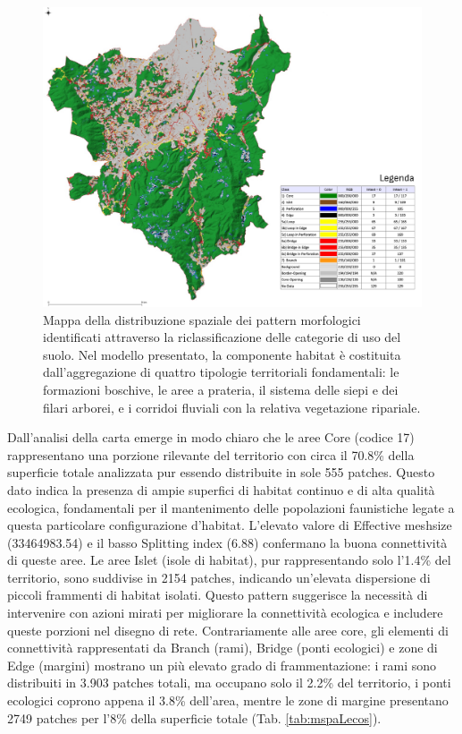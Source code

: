 \documentclass[
]{book}
\begin{document}
\begin{figure}

{\centering \includegraphics[width=\linewidth]{./figs/mspa8211_relazione} 

}

\caption{Mappa della distribuzione spaziale dei pattern morfologici identificati attraverso la riclassificazione delle categorie di uso del suolo. Nel modello presentato, la componente habitat è  costituita dall'aggregazione di quattro tipologie territoriali fondamentali: le formazioni boschive, le aree a prateria, il sistema delle siepi e dei filari arborei, e i corridoi fluviali con la relativa vegetazione ripariale.}\label{fig:mspaAll}
\end{figure}

Dall'analisi della carta emerge in modo chiaro che le aree Core (codice 17) rappresentano una porzione rilevante del territorio con circa il 70.8\% della superficie totale analizzata pur essendo distribuite in sole 555 patches.
Questo dato indica la presenza di ampie superfici di habitat continuo e di alta qualità ecologica, fondamentali per il mantenimento delle popolazioni faunistiche legate a questa particolare configurazione d'habitat.
L'elevato valore di Effective meshsize (33464983.54) e il basso Splitting index (6.88) confermano la buona connettività di queste aree.
Le aree Islet (isole di habitat), pur rappresentando solo l'1.4\% del territorio, sono suddivise in 2154 patches, indicando un'elevata dispersione di piccoli frammenti di habitat isolati.
Questo pattern suggerisce la necessità di intervenire con azioni mirati per migliorare la connettività ecologica e includere queste porzioni nel disegno di rete.
Contrariamente alle aree core, gli elementi di connettività rappresentati da Branch (rami), Bridge (ponti ecologici) e zone di Edge (margini) mostrano un più elevato grado di frammentazione: i rami sono distribuiti in 3.903 patches totali, ma occupano solo il 2.2\% del territorio, i ponti ecologici coprono appena il 3.8\% dell'area, mentre le zone di margine presentano 2749 patches per l'8\% della superficie totale (Tab. \ref{tab:mspaLecos}).
\end{document}
